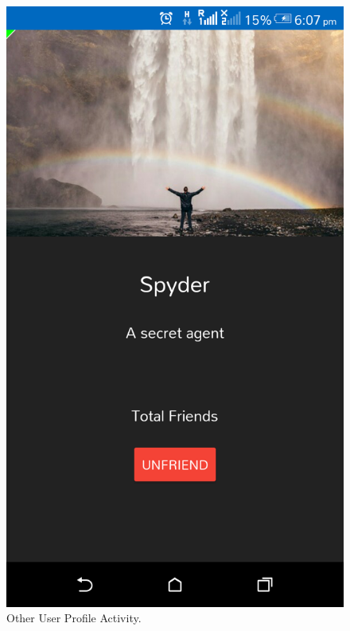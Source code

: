 \begin{appendices}
\begin{figure}[!ht]
	\centering
	\includegraphics[scale=0.2]{other-profile.png}
	\caption{\label{img23}  Other User Profile Activity.}
\end{figure}


\end{appendices}
